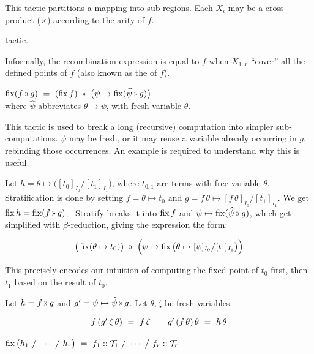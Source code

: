 This tactic partitions a mapping into sub-regions. Each $X_i$ may be a cross product ($\times$)
according to the arity of $f$.

\Obligations tactic.

Informally, the recombination expression is equal to $f$
when $X_{1..r}$ ``cover'' all the defined points of $f$ (also known as the  of $f$).

\medskip
{}
$\fix (f\applt g) ~=~ (\fix f) ~\applt~ \big(\psi\mapsto \fix (\widehat\psi\applt g)\big)$
\\
where $\widehat\psi$ abbreviates $\theta\mapsto\psi$, with fresh variable $\theta$.

This tactic is used to break a long (recursive) computation into simpler sub-computations.
$\psi$ may be fresh, or it may reuse a variable already occurring in $g$, rebinding those occurrences.
An example is required to understand why this is useful.

Let $h=\theta\mapsto\big([t_0]_{I_0}\big/[t_1]_{I_1}\big)$, where $t_{0,1}$ are terms with free variable $\theta$.
Stratification is done by setting $f=\theta\mapsto t_0$ and
 $g=f\,\theta\mapsto [f\,\theta]_{I_0}\big/[t_1]_{I_1}$. We get $\fix h=\fix(f\applt g)$; {\sf~Stratify}
breaks it into $\operatorname{fix} f$ and $\psi\mapsto \fix (\widehat\psi\applt g)$,
which get simplified with $\beta$-reduction, giving the expression the form:

\vspace{-5mm}
\[\big(\fix(\theta\mapsto t_0)\big) ~\applt~ 
  \Big(\psi\mapsto \fix \big(\theta\mapsto[\psi]_{I_0}\big/[t_1]_{I_1}\big)\Big)\]

\vspace{-2mm}
This precisely encodes our intuition of computing the fixed point of $t_0$ first,
then $t_1$ based on the result of $t_0$.

\Obligations Let $h=f\applt g$ and $g'=\psi\mapsto\widehat\psi\applt g$. Let $\theta,\zeta$ be
fresh variables.
\begin{equation}
\renewcommand\arraystretch{1.5}
\begin{array}{l@{\qquad}l}
f\,(g'\,\zeta\,\theta) ~=~ f\,\zeta &
g'\,(f\,\theta)\,\theta ~=~ h\,\theta
\end{array}
\label{tactics:Stratify obligations}
\end{equation}


 \label{tactics:Synth}
$\operatorname{fix}\big(h_1 ~\big/~ \cdots ~\big/~ h_r\big) ~=~ 
  f_1 :: \mathcal{T}_1 ~\big/~ \cdots ~\big/~ f_r :: \mathcal{T}_r$

